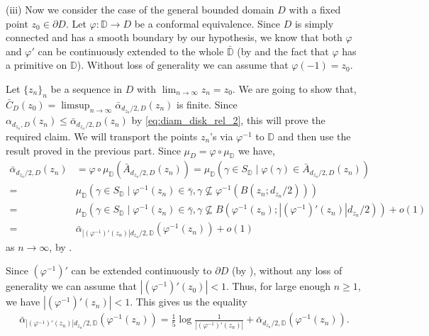 \documentclass[a4paper, 11pt, reqno]{amsart}
\theoremstyle{definition} \newtheorem{defn}{Definition}[section]
\theoremstyle{remark} \newtheorem{rem}[defn]{Remark}
\theoremstyle{remark} \newtheorem*{rem*}{Remark}
\theoremstyle{plain} \newtheorem{thm}[defn]{Theorem}
\theoremstyle{plain} \newtheorem{lem}[defn]{Lemma}
\theoremstyle{plain} \newtheorem{prop}[defn]{Proposition}
\theoremstyle{plain} \newtheorem{cor}[defn]{Corollary}
\theoremstyle{remark} \newtheorem{exm}[defn]{\textbf{Example}}
\theoremstyle{remark} \newtheorem{exms}[defn]{\textbf{Examples}}
\theoremstyle{remark} \newtheorem*{bl}{}
\numberwithin{equation}{section} %
\newcommand{\D}{\mathbb{D}}
\begin{document}
       (iii) Now we consider the case of the general bounded domain $D$ with a fixed point $z_0 \in \partial D$. Let $\varphi: \D \to D$ be a conformal equivalence. Since $D$ is simply connected and has a smooth boundary by our hypothesis, we know that both $\varphi$ and $\varphi'$ can be continuously extended to the whole $\bar{\D}$ (by \cite[Theorem 3.5]{pommerenke92} and the fact that $\varphi$ has a primitive on $\D$).  Without loss of generality we can assume that $\varphi(-1) = z_0$. 
       
       Let $\{z_n\}_n$ be a sequence in $D$ with $\lim_{n \to \infty}z_n = z_0$. We are going to show that, $\bar{C}_{D}(z_0) = \limsup_{n \to \infty} \bar{\alpha}_{d_{z_n}/2, D} (z_n)$ is finite. Since $\alpha_{d_{z_n}, D}(z_n) \le \bar{\alpha}_{d_{z_n}/2, D} (z_n)$ by \eqref{eq:diam_disk_rel_2}, this will prove the required claim. We will transport the points $z_n$'s via $\varphi^{-1}$ to $\D$ and then use the result proved in the previous part. Since $\mu_D = \varphi \circ \mu_{\D}$ we have,
      \begin{align}\label{eq:alpha_D_gen_near_bdry_1}
          \bar{\alpha}_{d_{z_n}/2, D} (z_n)  &  = \varphi\circ \mu_{\D} (\bar{A}_{d_{z_n}/2, D}(z_n))
          =  \mu_{\D} (\gamma \in S_{\D} \mid \varphi(\gamma) \in \bar{A}_{d_{z_n}/2, D}(z_n) )
          \nonumber \\
          = & \mu_{\D} (\gamma \in S_{\D} \mid  \varphi^{-1}(z_n) \in \bar{\gamma}, \gamma \nsubseteq \varphi^{-1}(B(z_n; d_{z_n}/2)))
          \nonumber \\
          = & \mu_{\D} (\gamma \in S_{\D} \mid  \varphi^{-1}(z_n) \in \bar{\gamma}, \gamma \nsubseteq B(\varphi^{-1}(z_n); |(\varphi^{-1})'(z_n)|d_{z_n}/2)) + o(1)
          \nonumber \\
          = & \bar{\alpha}_{|(\varphi^{-1})'(z_n)| d_{z_n}/2, \D} (\varphi^{-1}(z_n))+ o(1)
      \end{align}
      as $n \to \infty$, by \cite[Lemma 4.2]{cgk16}. 
      
      Since $(\varphi^{-1})'$ can be extended continuously to $\partial D$ (by \cite[Theorem 3.5]{pommerenke92}), without any loss of generality we can assume that $|(\varphi^{-1})'(z_0)|<1$. Thus, for large enough $n\ge 1$, we have $|(\varphi^{-1})'(z_n)|<1$. This gives us the equality
      \begin{align}\label{eq:alpha_D_gen_near_bdry_2}
          \bar{\alpha}_{|(\varphi^{-1})'(z_n)| d_{z_n}/2, \D} (\varphi^{-1}(z_n)) = \frac{1}{5} \log \frac{1}{|(\varphi^{-1})'(z_n)|} + \bar{\alpha}_{ d_{z_n}/2, \D} (\varphi^{-1}(z_n)).
      \end{align}
      
\end{document}
